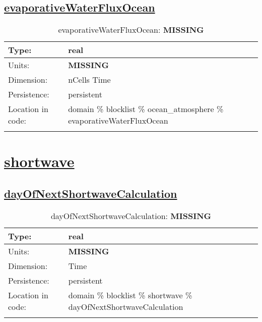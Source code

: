 \subsection[evaporativeWaterFluxOcean]{\hyperref[sec:var_tab_ocean_atmosphere]{evaporativeWaterFluxOcean}}
\label{subsec:var_sec_ocean_atmosphere_evaporativeWaterFluxOcean}
\begin{center}
\begin{longtable}{| p{2.0in} | p{4.0in} |}
        \hline 
        Type: & real \\
        \hline 
        Units: & {\bf \color{red} MISSING} \\
        \hline 
        Dimension: & nCells Time \\
        \hline 
        Persistence: & persistent \\
        \hline 
         Location in code: & domain \% blocklist \% ocean\_atmosphere \% evaporativeWaterFluxOcean \\
         \hline 
    \caption{evaporativeWaterFluxOcean: {\bf \color{red} MISSING}}
\end{longtable}
\end{center}
\section[shortwave]{\hyperref[sec:var_tab_shortwave]{shortwave}}
\label{sec:var_sec_shortwave}
\subsection[dayOfNextShortwaveCalculation]{\hyperref[sec:var_tab_shortwave]{dayOfNextShortwaveCalculation}}
\label{subsec:var_sec_shortwave_dayOfNextShortwaveCalculation}
\begin{center}
\begin{longtable}{| p{2.0in} | p{4.0in} |}
        \hline 
        Type: & real \\
        \hline 
        Units: & {\bf \color{red} MISSING} \\
        \hline 
        Dimension: & Time \\
        \hline 
        Persistence: & persistent \\
        \hline 
         Location in code: & domain \% blocklist \% shortwave \% dayOfNextShortwaveCalculation \\
         \hline 
    \caption{dayOfNextShortwaveCalculation: {\bf \color{red} MISSING}}
\end{longtable}
\end{center}
